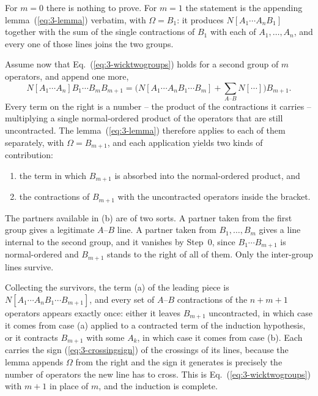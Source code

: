 For $m=0$ there is nothing to prove.  For $m=1$ the statement is the appending
lemma~(\ref{eq:3-lemma}) verbatim, with $\Omega=B_1$: it produces
$N[A_1\cdots A_nB_1]$ together with the sum of the single contractions of
$B_1$ with each of $A_1,\dots,A_n$, and every one of those lines joins the two
groups.

Assume now that Eq.~(\ref{eq:3-wicktwogroups}) holds for a second group of $m$
operators, and append one more,
\begin{equation}
  N\left[A_1\cdots A_n\right]B_1\cdots B_m B_{m+1}
   = \Big(N\left[A_1\cdots A_nB_1\cdots B_m\right]
     + \sum_{A\text{--}B} N\left[\cdots\right]\Big) B_{m+1} .
  \label{eq:3-twogroupstep}
\end{equation}
Every term on the right is a number -- the product of the contractions it
carries -- multiplying a single normal-ordered product of the operators that
are still uncontracted.  The lemma~(\ref{eq:3-lemma}) therefore applies to
each of them separately, with $\Omega=B_{m+1}$, and each application yields
two kinds of contribution:
\begin{enumerate}
\item[(a)] the term in which $B_{m+1}$ is absorbed into the normal-ordered
  product, and
\item[(b)] the contractions of $B_{m+1}$ with the uncontracted operators
  inside the bracket.
\end{enumerate}
The partners available in (b) are of two sorts.  A partner taken from the
first group gives a legitimate $A$--$B$ line.  A partner taken from
$B_1,\dots,B_m$ gives a line internal to the second group, and it vanishes by
Step~0, since $B_1\cdots B_{m+1}$ is normal-ordered and $B_{m+1}$ stands to
the right of all of them.  Only the inter-group lines survive.

Collecting the survivors, the term (a) of the leading piece is
$N[A_1\cdots A_nB_1\cdots B_{m+1}]$, and every set of $A$--$B$ contractions of
the $n+m+1$ operators appears exactly once: either it leaves $B_{m+1}$
uncontracted, in which case it comes from case (a) applied to a contracted
term of the induction hypothesis, or it contracts $B_{m+1}$ with some $A_k$,
in which case it comes from case (b).  Each carries the sign
(\ref{eq:3-crossingsign}) of the crossings of its lines, because the lemma
appends $\Omega$ from the right and the sign it generates is precisely the
number of operators the new line has to cross.  This is
Eq.~(\ref{eq:3-wicktwogroups}) with $m+1$ in place of $m$, and the induction
is complete.


